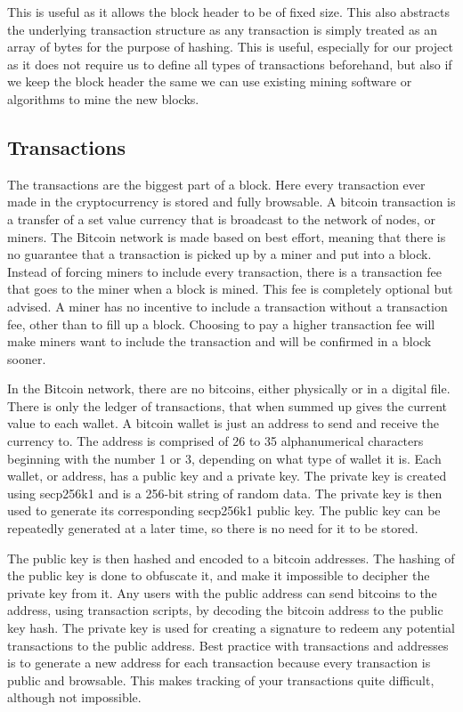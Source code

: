 \documentclass[12pt]{article}
\begin{document}

This is useful as it allows the block header to be of fixed size. This also abstracts the underlying transaction structure as any transaction is simply treated as an array of bytes for the purpose of hashing. This is useful, especially for our project as it does not require us to define all types of transactions beforehand, but also if we keep the block header the same we can use existing mining software or algorithms to mine the new blocks.


\subsection{Transactions}

The transactions are the biggest part of a block. Here every transaction ever made in the cryptocurrency is stored and fully browsable. A bitcoin transaction is a transfer of a set value currency that is broadcast to the network of nodes, or miners. The Bitcoin network is made based on best effort, meaning that there is no guarantee that a transaction is picked up by a miner and put into a block. Instead of forcing miners to include every transaction, there is a transaction fee that goes to the miner when a block is mined. This fee is completely optional but advised. A miner has no incentive to include a transaction without a transaction fee, other than to fill up a block. Choosing to pay a higher transaction fee will make miners want to include the transaction and will be confirmed in a block sooner. 

In the Bitcoin network, there are no bitcoins, either physically or in a digital file. There is only the ledger of transactions, that when summed up gives the current value to each wallet. A bitcoin wallet is just an address to send and receive the currency to. The address is comprised of 26 to 35 alphanumerical characters beginning with the number 1 or 3, depending on what type of wallet it is. Each wallet, or address, has a public key and a private key. The private key is created using secp256k1\cite{sigalg} and is a 256-bit string of random data. The private key is then used to generate its corresponding secp256k1 public key. The public key can be repeatedly generated at a later time, so there is no need for it to be stored. 

The public key is then hashed and encoded to a bitcoin addresses. The hashing of the public key is done to obfuscate it, and make it impossible to decipher the private key from it. Any users with the public address can send bitcoins to the address, using transaction scripts, by decoding the bitcoin address to the public key hash. The private key is used for creating a signature to redeem any potential transactions to the public address. Best practice with transactions and addresses is to generate a new address for each transaction because every transaction is public and browsable. This makes tracking of your transactions quite difficult, although not impossible\cite{meiklejohn2013fistful}. 
\end{document}
